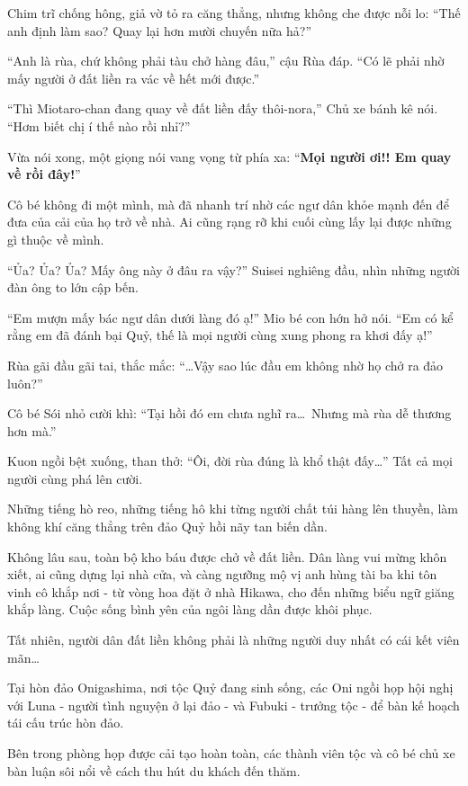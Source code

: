 \documentclass[../main.tex]{subfiles}
\begin{document}
Chim trĩ chống hông, giả vờ tỏ ra căng thẳng, nhưng không che được nỗi lo: ``Thế anh định làm sao? Quay lại hơn mười chuyến nữa hả?''

``Anh là rùa, chứ không phải tàu chở hàng đâu,'' cậu Rùa đáp. ``Có lẽ phải nhờ mấy người ở đất liền ra vác về hết mới được.''

``Thì Miotaro-chan đang quay về đất liền đấy thôi-nora,'' Chủ xe bánh kê nói. ``Hơm biết chị í thế nào rồi nhỉ?''

Vừa nói xong, một giọng nói vang vọng từ phía xa: ``\textbf{Mọi người ơi!! Em quay về rồi đây!}''

Cô bé không đi một mình, mà đã nhanh trí nhờ các ngư dân khỏe mạnh đến để đưa của cải của họ trở về nhà. Ai cũng rạng rỡ khi cuối cùng lấy lại được những gì thuộc về mình.

``Ủa? Ủa? Ủa? Mấy ông này ở đâu ra vậy?'' Suisei nghiêng đầu, nhìn những người đàn ông to lớn cập bến.

``Em mượn mấy bác ngư dân dưới làng đó ạ!'' Mio bé con hớn hở nói. ``Em có kể rằng em đã đánh bại Quỷ, thế là mọi người cùng xung phong ra khơi đấy ạ!''

Rùa gãi đầu gãi tai, thắc mắc: ``\dots Vậy sao lúc đầu em không nhờ họ chở ra đảo luôn?''

Cô bé Sói nhỏ cười khì: ``Tại hồi đó em chưa nghĩ ra\dots\ Nhưng mà rùa dễ thương hơn mà.''

Kuon ngồi bệt xuống, than thở: ``Ôi, đời rùa đúng là khổ thật đấy\dots'' Tất cả mọi người cùng phá lên cười.

Những tiếng hò reo, những tiếng hô khi từng người chất túi hàng lên thuyền, làm không khí căng thẳng trên đảo Quỷ hồi nãy tan biến dần.

Không lâu sau, toàn bộ kho báu được chở về đất liền. Dân làng vui mừng khôn xiết, ai cũng dựng lại nhà cửa, và càng ngưỡng mộ vị anh hùng tài ba khi tôn vinh cô khắp nơi - từ vòng hoa đặt ở nhà Hikawa, cho đến những biểu ngữ giăng khắp làng. Cuộc sống bình yên của ngôi làng dần được khôi phục.

Tất nhiên, người dân đất liền không phải là những người duy nhất có cái kết viên mãn\dots

Tại hòn đảo Onigashima, nơi tộc Quỷ đang sinh sống, các Oni ngồi họp hội nghị với Luna - người tình nguyện ở lại đảo - và Fubuki - trưởng tộc - để bàn kế hoạch tái cấu trúc hòn đảo.

Bên trong phòng họp được cải tạo hoàn toàn, các thành viên tộc và cô bé chủ xe bàn luận sôi nổi về cách thu hút du khách đến thăm.
\end{document}
